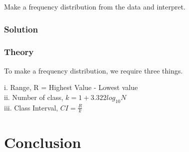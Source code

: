 \documentclass[a4paper,oneside, margin=1.4in]{book}
\begin{document}
Make a frequency distribution from the data and interpret. 

\subsection{Solution}
\subsection{Theory}

To make a frequency distribution, we require three things. 

i. Range, R = Highest Value - Lowest value \\
ii. Number of class, $k=1+3.322log_{10}N$ \\
iii. Class Interval, $CI = \frac{R}{k}$

\backmatter
\chapter{Conclusion}
\lipsum[8]

\tableofcontents
\end{document}
